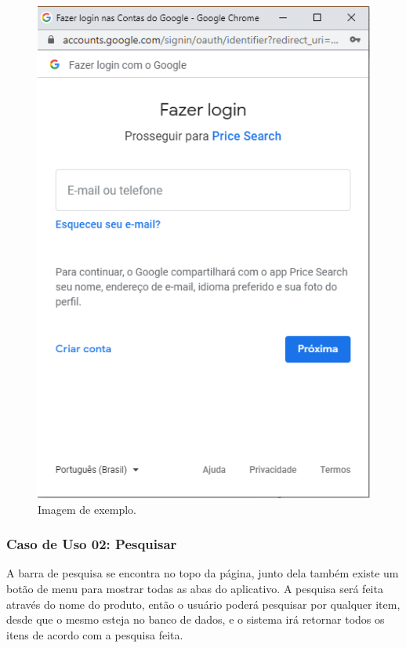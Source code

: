 \begin{figure}[!htb]
\centering
\caption{Imagem de exemplo.}
\includegraphics[width=\linewidth]{figuras/tela-login.png}
\end{figure}

\subsubsection{Caso de Uso 02: Pesquisar}

A barra de pesquisa se encontra no topo da página, junto dela também existe um botão de menu para mostrar todas as abas do aplicativo. A pesquisa será feita através do nome do produto, então o usuário poderá pesquisar por qualquer item, desde que o mesmo esteja no banco de dados, e o sistema irá retornar todos os itens de acordo com a pesquisa feita.

